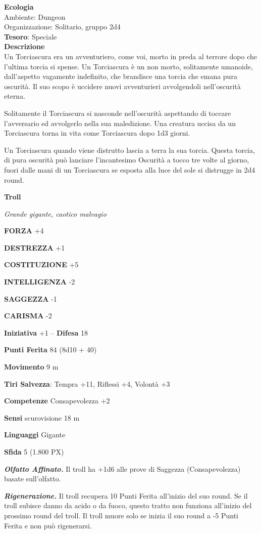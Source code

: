 \begin{multicols}{2}
\textbf{Ecologia}\\
Ambiente: Dungeon\\
Organizzazione: Solitario, gruppo 2d4\\
\textbf{Tesoro}: Speciale\\
\textbf{Descrizione}\\
Un Torciascura era un avventuriero, come voi, morto in preda al terrore dopo che l'ultima torcia si spense. Un Torciascura è un non morto, solitamente umanoide, dall'aspetto vagamente indefinito, che brandisce una torcia che emana pura oscurità. Il suo scopo è uccidere nuovi avventurieri avvolgendoli nell'oscurità eterna.

Solitamente il Torciascura si nasconde nell'oscurità aspettando di toccare l'avversario ed avvolgerlo nella sua maledizione. Una creatura uccisa da un Torciascura torna in vita come Torciascura dopo 1d3 giorni.

Un Torciascura quando viene distrutto lascia a terra la sua torcia. Questa torcia, di pura oscurità può lanciare l'incantesimo Oscurità a tocco tre volte al giorno, fuori dalle mani di un Torciascura se esposta alla luce del sole si distrugge in 2d4 round.


\medskip{}\textbf{Troll}

\textit{Grande gigante, caotico malvagio}

\textbf{FORZA} +4

\textbf{DESTREZZA} +1

\textbf{COSTITUZIONE} +5

\textbf{INTELLIGENZA} -2

\textbf{SAGGEZZA} -1

\textbf{CARISMA} -2

\textbf{Iniziativa} +1 -- \textbf{Difesa} 18

\textbf{Punti Ferita} 84 (8d10 + 40)

\textbf{Movimento} 9 m

\textbf{Tiri Salvezza}: Tempra +11, Riflessi +4, Volontà +3

\textbf{Competenze} Consapevolezza +2

\textbf{Sensi} scurovisione 18 m

\textbf{Linguaggi} Gigante

\textbf{Sfida} 5 (1.800 PX)

\textit{\textbf{Olfatto Affinato.}} Il troll ha +1d6 alle prove di Saggezza (Consapevolezza) basate sull'olfatto.

\textit{\textbf{Rigenerazione.}} Il troll recupera 10 Punti Ferita all'inizio del suo round. Se il troll subisce danno da acido o da fuoco, questo tratto non funziona all'inizio del prossimo round del troll. Il troll muore solo se inizia il suo round a -5 Punti Ferita e non può rigenerarsi.


\end{multicols}
